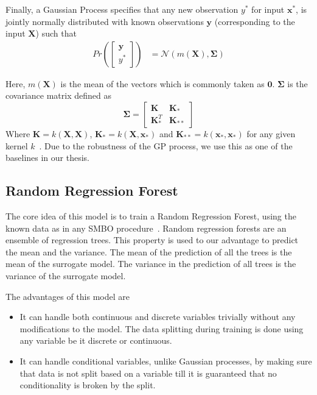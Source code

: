 \documentclass[11pt]{report}
\begin{document}
Finally,  a Gaussian Process specifies that any new observation $y^*$ for input $\textbf{x}^*$,  is jointly normally distributed with known observations $\textbf{y}$ (corresponding to the input $\textbf{X}$) such that
\begin{align}
    Pr\left( \begin{bmatrix}
           \textbf{y} \\
           y^*
         \end{bmatrix}
         \right)
         &=  \mathcal{N}\left(m(\textbf{X}), \mathbf{\Sigma}\right)
\end{align}

Here, $m(\textbf{X})$ is the mean of the vectors which is commonly taken as $\textbf{0}$.
$\mathbf{\Sigma}$ is the covariance matrix defined as
$$
\mathbf{\Sigma} = \begin{bmatrix}
           \textbf{K} & \textbf{K}_* \\
           \textbf{K}_*^T & \textbf{K}_{**}
         \end{bmatrix}
$$
  Where $\textbf{K} = k(\textbf{X}, \textbf{X})$,  $\textbf{K}_*  =  k(\textbf{X}, \textbf{x}_*)$ and $\textbf{K}_{**} = k(\textbf{x}_*,  \textbf{x}_*)$ for any given kernel $k$~\cite{GPTutorial}.
  Due to the robustness of the GP process, we use this as one of the baselines in our thesis.

\subsection{Random Regression Forest}
     The core idea of this model is to train a Random Regression Forest, using the known data as in any SMBO procedure~\cite{SMBOPaper}.
Random regression forests are an ensemble of regression trees. 
This property is used to our advantage to predict the mean and the variance. 
The mean of the prediction of all the trees is the mean of the surrogate model.
The variance in the prediction of all trees is the variance of the surrogate model.

   The advantages of this model are
   \begin{itemize}
   \item It can handle both continuous and discrete variables trivially without any modifications to the model.
The data splitting during training is done using any variable be it discrete or continuous.
	\item It can handle conditional variables, unlike Gaussian processes, by making sure that data is not split based on a variable till it is guaranteed that no conditionality is broken by the split.
   \end{itemize}
\end{document}
